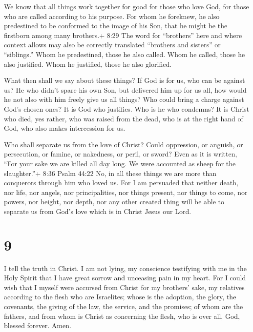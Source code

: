  We know that all things work together for good for those
who love God, for those who are called according to his purpose.
 For whom he foreknew, he also predestined to be conformed
to the image of his Son, that he might be the firstborn among many
brothers.+ 8:29 The word for ``brothers'' here and where context allows
may also be correctly translated ``brothers and sisters'' or
``siblings.''  Whom he predestined, those he also called.
Whom he called, those he also justified. Whom he justified, those he
also glorified.

 What then shall we say about these things? If God is for
us, who can be against us?  He who didn't spare his own
Son, but delivered him up for us all, how would he not also with him
freely give us all things?  Who could bring a charge
against God's chosen ones? It is God who justifies.  Who is
he who condemns? It is Christ who died, yes rather, who was raised from
the dead, who is at the right hand of God, who also makes intercession
for us.

 Who shall separate us from the love of Christ? Could
oppression, or anguish, or persecution, or famine, or nakedness, or
peril, or sword?  Even as it is written, ``For your sake we
are killed all day long. We were accounted as sheep for the
slaughter.''+ 8:36 Psalm 44:22  No, in all these things we
are more than conquerors through him who loved us.  For I
am persuaded that neither death, nor life, nor angels, nor
principalities, nor things present, nor things to come, nor powers,
 nor height, nor depth, nor any other created thing will be
able to separate us from God's love which is in Christ Jesus our Lord.

\hypertarget{section-8}{%
\section{9}\label{section-8}}

 I tell the truth in Christ. I am not lying, my conscience
testifying with me in the Holy Spirit  that I have great
sorrow and unceasing pain in my heart.  For I could wish
that I myself were accursed from Christ for my brothers' sake, my
relatives according to the flesh  who are Israelites; whose
is the adoption, the glory, the covenants, the giving of the law, the
service, and the promises;  of whom are the fathers, and
from whom is Christ as concerning the flesh, who is over all, God,
blessed forever. Amen.

